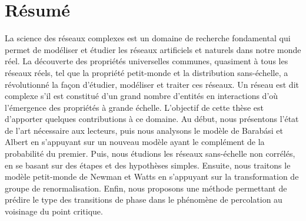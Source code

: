 %
%
\chapter*{Résumé}
La science des réseaux complexes est un domaine de recherche fondamental qui permet de modéliser et étudier les réseaux artificiels et naturels dans notre monde réel. La découverte
des propriétés universelles communes, quasiment à tous les réseaux réels, tel que la propriété petit-monde et la distribution sans-échelle, a révolutionné la façon
d’étudier, modéliser et traiter ces réseaux.
Un réseau est dit complexe s'il est constitué d'un grand nombre d'entités en interactions d’où l’émergence
des propriétés à grande échelle. L'objectif de cette thèse est d'apporter quelques contributions à ce domaine. Au début, nous présentons l’état de l’art nécessaire aux lecteurs, puis nous analysons le modèle de Barabási et Albert en s'appuyant sur un nouveau modèle ayant le complément de la probabilité du premier. Puis, nous étudions les réseaux sans-échelle non corrélés, en se basant sur des étapes et des hypothèses simples.
Ensuite, nous traitons le modèle petit-monde de Newman et Watts en s'appuyant sur la transformation de groupe de renormalisation.
Enfin, nous proposons une méthode permettant de prédire le type des transitions de phase  dans le phénomène de percolation au voisinage du point critique.
